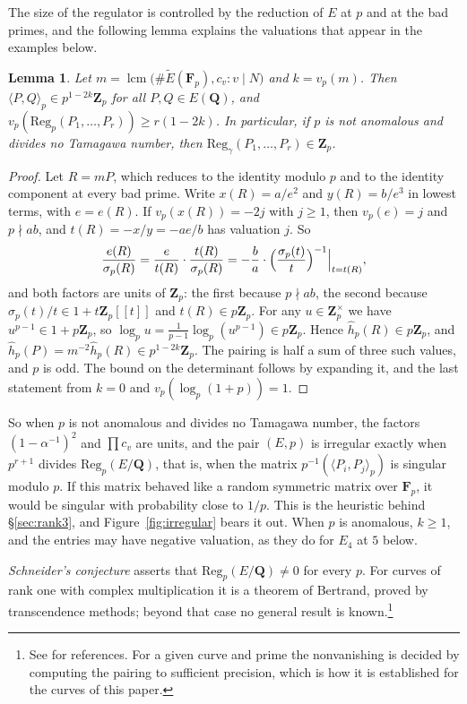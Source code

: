\documentclass[11pt]{amsart}
\newtheorem{lemma}[theorem]{Lemma}
\theoremstyle{definition}
\newcommand{\Q}{\mathbf{Q}}
\newcommand{\F}{\mathbf{F}}
\newcommand{\Zp}{\mathbf{Z}_p}
\newcommand{\Reg}{\mathrm{Reg}}
\begin{document}
The size of the regulator is controlled by the reduction of $E$ at $p$ and at the bad primes, and the following lemma explains the valuations that appear in the examples below.

\begin{lemma}\label{lem:heightval}
Let $m=\operatorname{lcm}\bigl(\#\tilde E(\F_p),c_v:v\mid N\bigr)$ and $k=v_p(m)$. Then $\langle P,Q\rangle_p\in p^{1-2k}\Zp$ for all $P,Q\in E(\Q)$, and $v_p(\Reg_p(P_1,\dots,P_r))\ge r(1-2k)$. In particular, if $p$ is not anomalous and divides no Tamagawa number, then $\Reg_\gamma(P_1,\dots,P_r)\in\Zp$.
\end{lemma}

\begin{proof}
Let $R=mP$, which reduces to the identity modulo $p$ and to the identity component at every bad prime. Write $x(R)=a/e^2$ and $y(R)=b/e^3$ in lowest terms, with $e=e(R)$. If $v_p(x(R))=-2j$ with $j\ge1$, then $v_p(e)=j$ and $p\nmid ab$, and $t(R)=-x/y=-ae/b$ has valuation $j$. So
\[
\frac{e(R)}{\sigma_p(R)}=\frac{e}{t(R)}\cdot\frac{t(R)}{\sigma_p(R)}=-\frac ba\cdot\Bigl(\frac{\sigma_p(t)}{t}\Bigr)^{-1}\Big|_{t=t(R)},
\]
and both factors are units of $\Zp$: the first because $p\nmid ab$, the second because $\sigma_p(t)/t\in1+t\Zp[[t]]$ and $t(R)\in p\Zp$. For any $u\in\Zp^\times$ we have $u^{p-1}\in1+p\Zp$, so $\log_pu=\tfrac1{p-1}\log_p(u^{p-1})\in p\Zp$. Hence $\hat h_p(R)\in p\Zp$, and $\hat h_p(P)=m^{-2}\hat h_p(R)\in p^{1-2k}\Zp$. The pairing is half a sum of three such values, and $p$ is odd. The bound on the determinant follows by expanding it, and the last statement from $k=0$ and $v_p(\log_p(1+p))=1$.
\end{proof}

So when $p$ is not anomalous and divides no Tamagawa number, the factors $(1-\alpha^{-1})^2$ and $\prod c_v$ are units, and the pair $(E,p)$ is irregular exactly when $p^{r+1}$ divides $\Reg_p(E/\Q)$, that is, when the matrix $p^{-1}(\langle P_i,P_j\rangle_p)$ is singular modulo $p$. If this matrix behaved like a random symmetric matrix over $\F_p$, it would be singular with probability close to $1/p$. This is the heuristic behind \S\ref{sec:rank3}, and Figure~\ref{fig:irregular} bears it out. When $p$ is anomalous, $k\ge1$, and the entries may have negative valuation, as they do for $E_4$ at $5$ below.

\emph{Schneider's conjecture} asserts that $\Reg_p(E/\Q)\neq0$ for every $p$. For curves of rank one with complex multiplication it is a theorem of Bertrand, proved by transcendence methods; beyond that case no general result is known.\footnote{See \cite{SW13} for references. For a given curve and prime the nonvanishing is decided by computing the pairing to sufficient precision, which is how it is established for the curves of this paper.}
\end{document}
